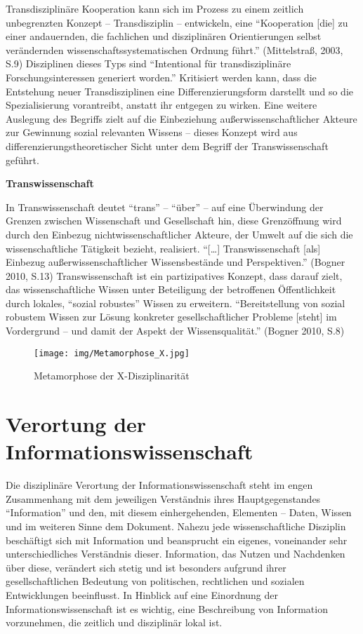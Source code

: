 \documentclass[a4paper,
fontsize=11pt,
oneside,
numbers=noperiodatend,
parskip=half-,
bibliography=totoc,
final
]{scrartcl}
\begin{document}
Transdisziplinäre Kooperation kann sich im Prozess zu einem zeitlich
unbegrenzten Konzept -- Transdisziplin -- entwickeln, eine
\enquote{Kooperation {[}die{]} zu einer andauernden, die fachlichen und
disziplinären Orientierungen selbst verändernden
wissenschaftssystematischen Ordnung führt.} (Mittelstraß, 2003, S.9)
Disziplinen dieses Typs sind \enquote{Intentional für transdisziplinäre
Forschungsinteressen generiert worden.} Kritisiert werden kann, dass die
Entstehung neuer Transdisziplinen eine Differenzierungsform darstellt
und so die Spezialisierung vorantreibt, anstatt ihr entgegen zu wirken.
Eine weitere Auslegung des Begriffs zielt auf die Einbeziehung
außerwissenschaftlicher Akteure zur Gewinnung sozial relevanten Wissens
-- dieses Konzept wird aus differenzierungstheoretischer Sicht unter dem
Begriff der Transwissenschaft geführt.

\textbf{Transwissenschaft}

In Transwissenschaft deutet \enquote{trans} -- \enquote{über} -- auf
eine Überwindung der Grenzen zwischen Wissenschaft und Gesellschaft hin,
diese Grenzöffnung wird durch den Einbezug nichtwissenschaftlicher
Akteure, der Umwelt auf die sich die wissenschaftliche Tätigkeit
bezieht, realisiert. \enquote{{[}\ldots{}{]} Transwissenschaft {[}als{]}
Einbezug außerwissenschaftlicher Wissensbestände und Perspektiven.}
(Bogner 2010, S.13) Transwissenschaft ist ein partizipatives Konzept,
dass darauf zielt, das wissenschaftliche Wissen unter Beteiligung der
betroffenen Öffentlichkeit durch lokales, \enquote{sozial robustes}
Wissen zu erweitern. \enquote{Bereitstellung von sozial robustem Wissen
zur Lösung konkreter gesellschaftlicher Probleme {[}steht{]} im
Vordergrund -- und damit der Aspekt der Wissensqualität.} (Bogner 2010,
S.8)

\begin{figure}
\centering
\texttt{[image: img/Metamorphose\_X.jpg]}
\caption{Metamorphose der X-Disziplinarität}
\end{figure}

\section*{Verortung der
Informationswissenschaft}\label{verortung-der-informationswissenschaft}

Die disziplinäre Verortung der Informationswissenschaft steht im engen
Zusammenhang mit dem jeweiligen Verständnis ihres Hauptgegenstandes
\enquote{Information} und den, mit diesem einhergehenden, Elementen --
Daten, Wissen und im weiteren Sinne dem Dokument. Nahezu jede
wissenschaftliche Disziplin beschäftigt sich mit Information und
beansprucht ein eigenes, voneinander sehr unterschiedliches Verständnis
dieser. Information, das Nutzen und Nachdenken über diese, verändert
sich stetig und ist besonders aufgrund ihrer gesellschaftlichen
Bedeutung von politischen, rechtlichen und sozialen Entwicklungen
beeinflusst. In Hinblick auf eine Einordnung der
Informationswissenschaft ist es wichtig, eine Beschreibung von
Information vorzunehmen, die zeitlich und disziplinär lokal ist.
\end{document}
